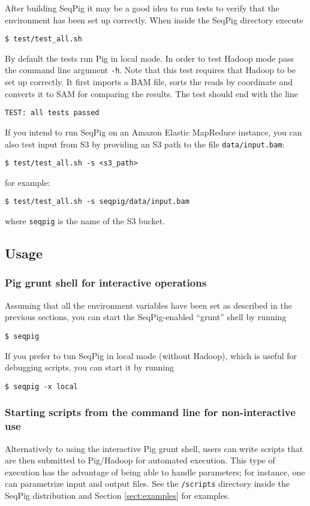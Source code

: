 After building SeqPig it may be a good idea to run tests to verify that
the environment has been set up correctly. When inside the SeqPig directory
execute
\begin{lstlisting} 
$ test/test_all.sh
\end{lstlisting}
By default the tests run Pig in local mode. In order to test Hadoop
mode pass the command line argument {\tt -h}. Note that this test
requires that Hadoop to be set up correctly. It first imports a BAM
file, sorts the reads by coordinate and converts it to SAM for
comparing the results. The test should end with the line
\begin{lstlisting}
TEST: all tests passed
\end{lstlisting}
If you intend to run SeqPig on an Amazon Elastic MapReduce instance, you can
also test input from S3 by providing an S3 path to the file {\tt data/input.bam}:
\begin{lstlisting} 
$ test/test_all.sh -s <s3_path>
\end{lstlisting}
for example:
\begin{lstlisting} 
$ test/test_all.sh -s seqpig/data/input.bam
\end{lstlisting}
where {\tt seqpig} is the name of the S3 bucket.

\subsection{Usage}

\subsubsection{Pig grunt shell for interactive operations}
Assuming that all the environment variables have been set as described in the
previous sections, you can start the SeqPig-enabled ``grunt'' shell by running
%
\begin{lstlisting}
$ seqpig
\end{lstlisting}
%
If you prefer to tun SeqPig in local mode (without Hadoop), which is useful
for debugging scripts, you can start it by running
%
\begin{lstlisting}
$ seqpig -x local
\end{lstlisting}
%
\subsubsection{Starting scripts from the command line for non-interactive use}
Alternatively to using the interactive Pig grunt shell, users can write scripts
that are then submitted to Pig/Hadoop for automated execution. This type of
execution has the advantage of being able to handle parameters; for instance,
one can parametrize input and output files. See the {\tt /scripts} directory
inside the SeqPig distribution and Section \ref{sect:examples} for examples.
